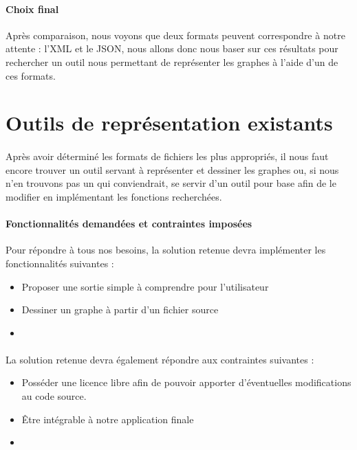   \paragraph{Choix final}
  Après comparaison, nous voyons que deux formats peuvent correspondre à notre attente : l'XML et le JSON, nous allons donc nous baser sur ces résultats pour rechercher un outil nous permettant de représenter les graphes à l'aide d'un de ces formats.

  \section{Outils de représentation existants}
  
  \paragraph{}
  Après avoir déterminé les formats de fichiers les plus appropriés, il nous faut encore trouver un outil servant à représenter et dessiner les graphes ou, si nous n'en trouvons pas un qui conviendrait, se servir d'un outil pour base afin de le modifier en implémentant les fonctions recherchées.
  
  \paragraph{Fonctionnalités demandées et contraintes imposées}
  Pour répondre à tous nos besoins, la solution retenue devra implémenter les fonctionnalités suivantes : 
  \begin{itemize}
  	\item Proposer une sortie simple à comprendre pour l'utilisateur
  	\item Dessiner un graphe à partir d'un fichier source
  	\item 
  \end{itemize}
  
  \paragraph{}
  La solution retenue devra également répondre aux contraintes suivantes : 
  \begin{itemize}
  	\item Posséder une licence libre afin de pouvoir apporter d'éventuelles modifications au code source.
  	\item Être intégrable à notre application finale
  	\item 
  \end{itemize}

